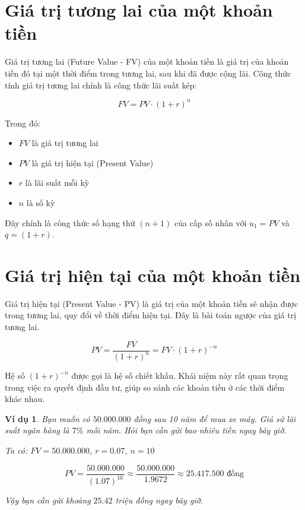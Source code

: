 \documentclass[12pt,a4paper]{report}
\newtheorem{example}{Ví dụ}[section]
\begin{document}
\section{Giá trị tương lai của một khoản tiền}

Giá trị tương lai (Future Value - FV) của một khoản tiền là giá trị của khoản tiền đó tại một thời điểm trong tương lai, sau khi đã được cộng lãi. Công thức tính giá trị tương lai chính là công thức lãi suất kép:

\[
    FV = PV \cdot (1 + r)^n
\]

Trong đó:

\begin{itemize}[label=\textbullet]
    \item $FV$ là giá trị tương lai
    \item $PV$ là giá trị hiện tại (Present Value)
    \item $r$ là lãi suất mỗi kỳ
    \item $n$ là số kỳ
\end{itemize}

Đây chính là công thức số hạng thứ $(n+1)$ của cấp số nhân với $u_1 = PV$ và $q = (1 + r)$.

\section{Giá trị hiện tại của một khoản tiền}

Giá trị hiện tại (Present Value - PV) là giá trị của một khoản tiền sẽ nhận được trong tương lai, quy đổi về thời điểm hiện tại. Đây là bài toán ngược của giá trị tương lai.

\[
    PV = \frac{FV}{(1 + r)^n}
    = FV \cdot (1 + r)^{-n}
\]

Hệ số $(1 + r)^{-n}$ được gọi là hệ số chiết khấu. Khái niệm này rất quan trọng trong việc ra quyết định đầu tư, giúp so sánh các khoản tiền ở các thời điểm khác nhau.

\begin{example}
    Bạn muốn có $50.000.000$ đồng sau 10 năm để mua xe máy. Giả sử lãi suất ngân hàng là $7\%$ mỗi năm. Hỏi bạn cần gửi bao nhiêu tiền ngay bây giờ.
    
    Ta có:
    $FV = 50.000.000$,
    $r = 0.07$,
    $n = 10$
    
    \[
        PV
        = \frac{50.000.000}{(1.07)^{10}}
        \approx \frac{50.000.000}{1.9672}
        \approx 25.417.500 \text{ đồng}
    \]
    
    Vậy bạn cần gửi khoảng $25.42$ triệu đồng ngay bây giờ.
\end{example}
\end{document}
